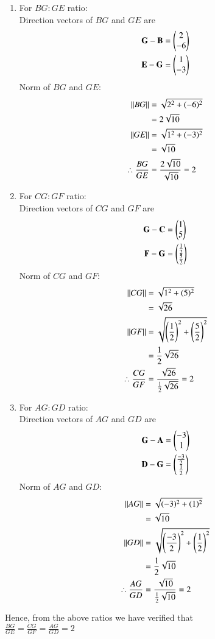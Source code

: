 \documentclass[journal,12pt,onecolumn]{IEEEtran}
\theoremstyle{remark}
\begin{document}
\begin{enumerate} 
\item For ${BG}:{GE}$ ratio:\\
Direction vectors of $BG$ and $GE$ are \\
\begin{align}
\mathbf{G}-\mathbf{B}&=\begin{pmatrix}2\\-6\end{pmatrix}\\
\mathbf{E}-\mathbf{G}&=\begin{pmatrix}1\\-3\end{pmatrix}
\end{align} 
Norm of $BG$ and $GE$:
\begin{align}
\left\lVert BG\right\rVert&=\sqrt{2^2+(-6)^2}\\
               &=2\sqrt{10}\\
\left\lVert GE\right\rVert&=\sqrt{1^2+(-3)^2}\\
               &=\sqrt{10} \\             
\therefore \frac{BG}{GE}&=\frac{2\sqrt{10}}{\sqrt{10}}=2
\end{align}  
\item For ${CG}:{GF}$ ratio:\\
Direction vectors of $CG$ and $GF$ are \\    
\begin{align}
\mathbf{G}-\mathbf{C}&=\begin{pmatrix}1\\5\end{pmatrix}\\
\mathbf{F}-\mathbf{G}&=\begin{pmatrix}\frac{1}{2}\\\frac{5}{2}\end{pmatrix}
\end{align}
Norm of $CG$ and $GF$:\\
\begin{align}
\left\lVert CG\right\rVert&=\sqrt{1^2+(5)^2}\\
               &=\sqrt{26}\\
\left\lVert GF\right\rVert&=\sqrt{\left(\frac{1}{2}\right)^2+\left(\frac{5}{2}\right)^2}\\
               &=\frac{1}{2}\sqrt{26}\\
\therefore \frac{CG}{GF}&=\frac{\sqrt{26}}{\frac{1}{2}\sqrt{26}}=2
\end{align}
\item For ${AG}:{GD}$ ratio:\\
Direction vectors of $AG$ and $GD$ are \\
\begin{align}       
\mathbf{G}-\mathbf{A}&=\begin{pmatrix}-3\\1\end{pmatrix}\\
\mathbf{D}-\mathbf{G}&=\begin{pmatrix}\frac{-3}{2}\\\frac{1}{2}\end{pmatrix}
\end{align}
Norm of $AG$ and $GD$:\\
\begin{align}
\left\lVert AG\right\rVert&=\sqrt{(-3)^2+(1)^2}\\
               &=\sqrt{10}\\
\left\lVert GD\right\rVert&=\sqrt{\left(\frac{-3}{2}\right)^2+\left(\frac{1}{2}\right)^2}\\
               &=\frac{1}{2}\sqrt{10}\\
\therefore \frac{AG}{GD}&=\frac{\sqrt{10}}{\frac{1}{2}\sqrt{10}}=2
\end{align}
\end{enumerate}
Hence, from the above ratios we have verified that \\
$\frac{BG}{GE}=\frac{CG}{GF}=\frac{AG}{GD}=2$
\end{document}
